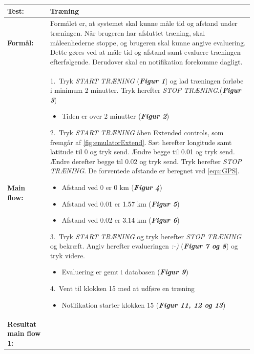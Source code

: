   \begin{longtable}{ | p{2cm} | p{13cm} |} \hline
    \textbf{Test:} & Træning \\ \hline
  \textbf{Formål:} & Formålet er, at systemet skal kunne måle tid og afstand under træningen. Når brugeren har afsluttet træning, skal måleenhederne stoppe, og brugeren skal kunne angive evaluering. Dette gøres ved at måle tid og afstand samt evaluere træningen efterfølgende. Derudover skal en notifikation forekomme dagligt.
 \\ \hline
 	\textbf{Main flow:} & 1.~Tryk \textit{START TRÆNING} (\textbf{\textit{Figur 1}}) og lad træningen forløbe i minimum 2 minutter. Tryk herefter \textit{STOP TRÆNING}.(\textbf{\textit{Figur 3}})
 	\begin{itemize}
 	\item Tiden er over 2 minutter (\textbf{\textit{Figur 2}})
 	\end{itemize}	
 	2.~Tryk \textit{START TRÆNING} åben Extended controls, som fremgår af \autoref{fig:emulatorExtend}. Sæt herefter longitude samt latitude til 0 og tryk send. Ændre begge til 0.01 og tryk send. Ændre derefter begge til 0.02 og tryk send. Tryk herefter \textit{STOP TRÆNING}. De forventede afstande er beregnet ved \autoref{equ:GPS}. 
 	\begin{itemize}
 	\item Afstand ved 0 er 0 km (\textbf{\textit{Figur 4}})
 	\item Afstand ved 0.01 er 1.57 km (\textbf{\textit{Figur 5}})
 	\item Afstand ved 0.02 er 3.14 km (\textbf{\textit{Figur 6}})
	\end{itemize}
  3.~Tryk \textit{START TRÆNING} og tryk herefter \textit{STOP TRÆNING} og bekræft. Angiv herefter evalueringen \textit{:-)} (\textbf{\textit{Figur 7 og 8}}) og tryk videre.
  \begin{itemize}
  \item Evaluering er gemt i databasen (\textbf{\textit{Figur 9}})
  \end{itemize}
   4.~Vent til klokken 15 med at udføre en træning 
  \begin{itemize}
  \item Notifikation starter klokken 15 (\textbf{\textit{Figur 11, 12 og 13}})
  \vspace{1mm}
  \end{itemize}
\\ \hline
\textbf{Resultat main flow 1:} &\hspace{1.5mm}

\end{longtable}
